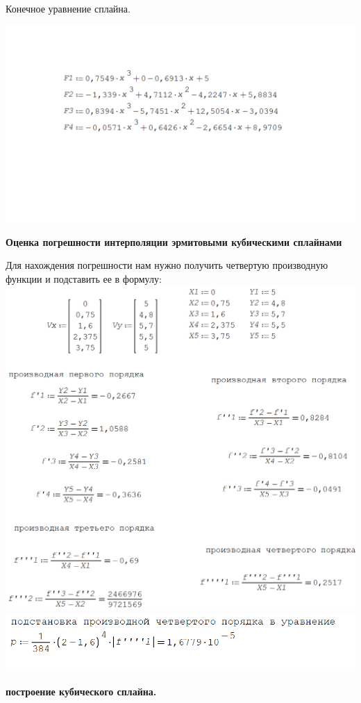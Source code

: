 \documentclass[russian,utf8,nocolumnxxxi,nocolumnxxxii]{eskdtext}
\begin{document}
\par
\normalsize
Конечное уравнение сплайна.
\begin{center}\includegraphics[scale=0.5]{16.png}\end{center}

\newpage
\begin{center}

{\bf Оценка погрешности интерполяции эрмитовыми
кубическими сплайнами}

\end{center}
Для нахождения погрешности нам нужно получить четвертую производную функции и подставить ее в формулу:
\\\includegraphics[scale=0.55]{18.png}
\\\includegraphics[scale=0.55]{19.png}
\newpage
\begin{center}{\bf построение кубического сплайна.}\\\end{center}
\end{document}
